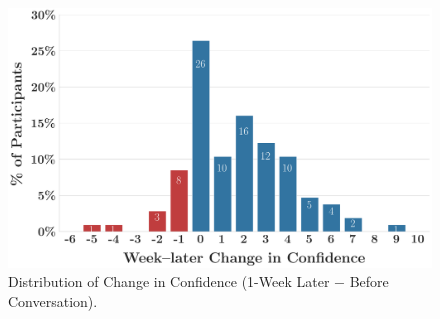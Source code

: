 \begin{figure}[!tphb]
\centering
  \includegraphics[width=\linewidth]{fig/2024-11-14-MIV6.3A-2024-11-22-MIV6.3A_ruler_deltas_delta_with_week_later_keep_high_conf_False_change.png}
  \caption {Distribution of Change in Confidence (1-Week Later $-$ Before Conversation).}
  \label{fig:confidence_change_dist}
\end{figure}

